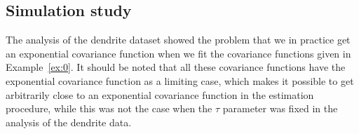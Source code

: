 \documentclass[alpha-refs]{wiley-article}
\begin{document}
\subsection{Simulation study}\label{s:simstudy}

The analysis of the dendrite dataset showed the problem that we in practice get an exponential covariance function when we fit the covariance functions given in Example~\ref{ex:0}. It should be noted that all these covariance functions have the exponential covariance function as a limiting case, which makes it possible to get arbitrarily close to an exponential covariance function in the estimation procedure, while this was not the case when the $\tau$ parameter was fixed in the analysis of the dendrite data. 

\end{document}
